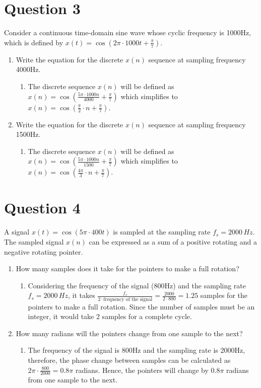\documentclass{article}
\begin{document}
\section*{Question 3}
Consider a continuous time-domain sine wave whose cyclic frequency is 1000Hz, which is defined by \( x(t) = \cos(2 \pi \cdot 1000t + \frac{\pi}{7}) \).
\begin{enumerate}
    \item Write the equation for the discrete \( x(n) \) sequence at sampling frequency 4000Hz.
    \begin{enumerate}
        \item The discrete sequence \( x(n) \) will be defined as \( x(n) = \cos\left(\frac{5 \pi \cdot 1000n}{4000} + \frac{\pi}{7}\right) \) which simplifies to \( x(n) = \cos\left(\frac{\pi}{2} \cdot n + \frac{\pi}{7}\right) \).
    \end{enumerate}
    \item Write the equation for the discrete \( x(n) \) sequence at sampling frequency 1500Hz.
    \begin{enumerate}
        \item The discrete sequence \( x(n) \) will be defined as \( x(n) = \cos\left(\frac{5 \pi \cdot 1000n}{1500} + \frac{\pi}{7}\right) \) which simplifies to \( x(n) = \cos\left(\frac{4\pi}{3} \cdot n + \frac{\pi}{7}\right) \).
    \end{enumerate}
\end{enumerate}

\section*{Question 4}
A signal \( x(t) = \cos(5 \pi \cdot 400t) \) is sampled at the sampling rate \( f_s = 2000\,Hz \). The sampled signal \( x(n) \) can be expressed as a sum of a positive rotating and a negative rotating pointer.
\begin{enumerate}
    \item How many samples does it take for the pointers to make a full rotation?
    \begin{enumerate}
        \item Considering the frequency of the signal (800Hz) and the sampling rate \( f_s = 2000\,Hz \), it takes \(\frac{f_s}{2 \cdot \text{frequency of the signal}} = \frac{2000}{2 \cdot 800} = 1.25\) samples for the pointers to make a full rotation. Since the number of samples must be an integer, it would take 2 samples for a complete cycle.
    \end{enumerate}
    \item How many radians will the pointers change from one sample to the next?
    \begin{enumerate}
        \item The frequency of the signal is 800Hz and the sampling rate is 2000Hz, therefore, the phase change between samples can be calculated as \( 2\pi \cdot \frac{800}{2000} = 0.8\pi \) radians. Hence, the pointers will change by \( 0.8\pi \) radians from one sample to the next.
    \end{enumerate}
\end{enumerate}
\end{document}
